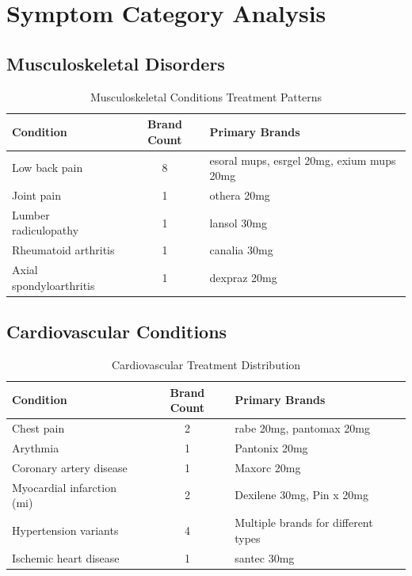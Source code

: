 \documentclass[10pt]{article}
\begin{document}
\section{Symptom Category Analysis}

\subsection{Musculoskeletal Disorders}
\begin{table}[h!]
\centering
\caption{Musculoskeletal Conditions Treatment Patterns}
\begin{tabular}{l|c|l}
\toprule
\rowcolor{headercolor}
\textbf{Condition} & \textbf{Brand Count} & \textbf{Primary Brands} \\
\midrule
Low back pain & 8 & esoral mups, esrgel 20mg, exium mups 20mg \\
\rowcolor{altrowcolor}
Joint pain & 1 & othera 20mg \\
Lumber radiculopathy & 1 & lansol 30mg \\
\rowcolor{altrowcolor}
Rheumatoid arthritis & 1 & canalia 30mg \\
Axial spondyloarthritis & 1 & dexpraz 20mg \\
\bottomrule
\end{tabular}
\end{table}

\subsection{Cardiovascular Conditions}
\begin{table}[h!]
\centering
\caption{Cardiovascular Treatment Distribution}
\begin{tabular}{l|c|l}
\toprule
\rowcolor{headercolor}
\textbf{Condition} & \textbf{Brand Count} & \textbf{Primary Brands} \\
\midrule
Chest pain & 2 & rabe 20mg, pantomax 20mg \\
\rowcolor{altrowcolor}
Arythmia & 1 & Pantonix 20mg \\
Coronary artery disease & 1 & Maxorc 20mg \\
\rowcolor{altrowcolor}
Myocardial infarction (mi) & 2 & Dexilene 30mg, Pin x 20mg \\
Hypertension variants & 4 & Multiple brands for different types \\
\rowcolor{altrowcolor}
Ischemic heart disease & 1 & santec 30mg \\
\bottomrule
\end{tabular}
\end{table}
\end{document}
